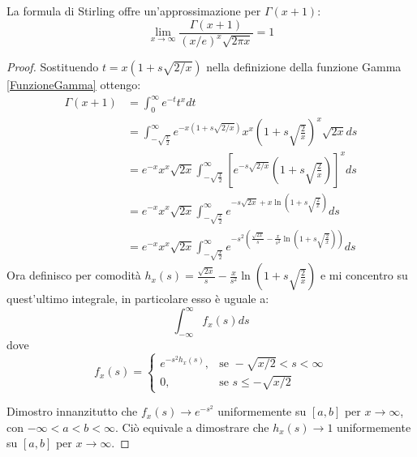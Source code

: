 \begin{theorem}\label{StirlingGamma}
	La formula di Stirling offre un'approssimazione per $\Gamma(x+1)$:
	\begin{equation*}
		\lim_{x\to\infty}\frac{\Gamma(x+1)}{(x/e)^x\sqrt{2\pi x}}=1
	\end{equation*}
\end{theorem}
\begin{proof}
	Sostituendo $t=x(1+s\sqrt{2/x})$ nella definizione della funzione Gamma \cref{FunzioneGamma} ottengo:
	\begin{equation*}
	\begin{split}
		\Gamma(x+1) & = \int_0^\infty{e^{-t}t^{x}dt}\\
					& = \int_{-\sqrt{\frac{x}{2}}}^\infty{ e^{-x(1+s\sqrt{2/x})} x^x\left(1+s\sqrt{\frac{2}{x}}\right)^x \sqrt{2x} ds}\\
					& = e^{-x}x^x\sqrt{2x}\int_{-\sqrt{\frac{x}{2}}}^\infty{ \left[e^{-s\sqrt{2/x}} \left(1+s\sqrt{\frac{2}{x}}\right)\right]^x ds}\\
					& = e^{-x}x^x\sqrt{2x}\int_{-\sqrt{\frac{x}{2}}}^\infty{ e^{-s\sqrt{2x}+x\ln\left(1+s\sqrt{\frac{2}{x}}\right)} ds}\\
					& = e^{-x}x^x\sqrt{2x}\int_{-\sqrt{\frac{x}{2}}}^\infty{ e^{-s^2\left(\frac{\sqrt{2x}}{s}-\frac{x}{s^2}\ln\left(1+s\sqrt{\frac{2}{x}}\right)\right)} ds}
	\end{split}
	\end{equation*}
	Ora definisco per comodità $h_x(s)=\frac{\sqrt{2x}}{s}-\frac{x}{s^2}\ln\left(1+s\sqrt{\frac{2}{x}}\right)$ 
	e mi concentro su quest'ultimo integrale, in particolare esso è uguale a:
	\begin{equation*}
		\int_{-\infty}^\infty{ f_x(s) ds}
	\end{equation*}
	dove 
	\begin{equation*}
		f_x(s)=\begin{cases}
				e^{-s^2h_x(s)}, & \mbox{se } -\sqrt{x/2}<s<\infty \\
							 0, & \mbox{se } s\le -\sqrt{x/2}
	\end{cases}
	\end{equation*}
	
	Dimostro innanzitutto che $f_x(s)\to e^{-s^2}$ uniformemente su $[a,b]$ per $x\to\infty$, con 
	$-\infty<a<b<\infty$. Ciò equivale a dimostrare che $h_x(s)\to 1$ uniformemente su $[a,b]$ per $x\to\infty$.
	
	
\end{proof}



